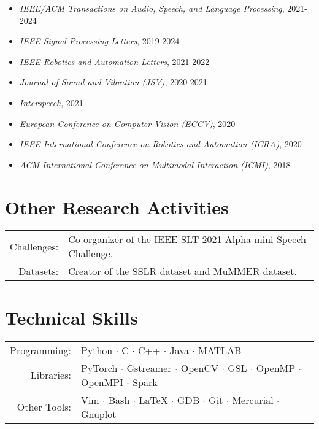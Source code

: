 \documentclass[a4paper,9pt]{extarticle} %
\begin{document}
\begin{itemize}[itemsep=-.9em]
  \item \textit{IEEE/ACM Transactions on Audio, Speech, and Language Processing}, 2021-2024
  \item \textit{IEEE Signal Processing Letters}, 2019-2024
  \item \textit{IEEE Robotics and Automation Letters}, 2021-2022
  \item \textit{Journal of Sound and Vibration (JSV)}, 2020-2021
  \item \textit{Interspeech}, 2021
  \item \textit{European Conference on Computer Vision (ECCV)}, 2020
  \item \textit{IEEE International Conference on Robotics and Automation (ICRA)}, 2020
  \item \textit{ACM International Conference on Multimodal Interaction (ICMI)}, 2018
\end{itemize}


\section{Other Research Activities}

\begin{tabular}{rl}
  Challenges: & Co-organizer of the \href{http://asc.ubtrobot.com/}{IEEE SLT 2021 Alpha-mini Speech Challenge}. \\
  Datasets:   & Creator of the \href{https://www.idiap.ch/dataset/sslr}{SSLR dataset} and \href{https://www.idiap.ch/dataset/mummer}{MuMMER dataset}. \\
\end{tabular}


\section{Technical Skills}

\begin{tabular}{rl}
  Programming: & Python $\cdotp$ C $\cdotp$ C++ $\cdotp$ Java $\cdotp$ MATLAB \\
  Libraries: & PyTorch $\cdotp$ Gstreamer $\cdotp$ OpenCV $\cdotp$ GSL $\cdotp$ OpenMP $\cdotp$ OpenMPI $\cdotp$ Spark \\
  Other Tools: & Vim $\cdotp$ Bash $\cdotp$ \LaTeX{} $\cdotp$ GDB $\cdotp$ Git $\cdotp$ Mercurial $\cdotp$ Gnuplot \\
\end{tabular}
\end{document}
